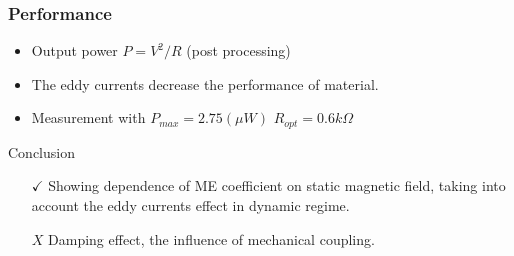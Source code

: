 \documentclass[compress]{beamer}
\begin{document}
\begin{frame}\frametitle{Performance}
\hspace{0.5cm}
\begin{itemize}[label=$\bullet$, font=\small, leftmargin=*]
\item Output power $P=V^2/R$ (post processing)
\item The eddy currents decrease the performance of material.
\item Measurement with $P_{max}=2.75(\mu W)$ $R_{opt}=0.6 k\Omega$
\end{itemize}

\begin{block}{Conclusion}
\begin{itemize}[]
	\item[{\color{green} $\checkmark$}] Showing dependence of ME coefficient on static magnetic field, taking into account the eddy currents effect in dynamic regime.
	\item[{\color{red} $X$}] Damping effect, the influence of mechanical coupling.
	\end{itemize}
\end{block}	
\end{frame}
\end{document}

